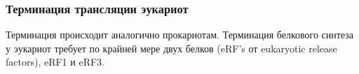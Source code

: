 \subsubsection{Терминация трансляции эукариот}

Терминация происходит аналогично прокариотам. Терминация белкового синтеза у эукариот требует по крайней мере двух белков (eRF's от eukaryotic release factors), eRF1 и eRF3.